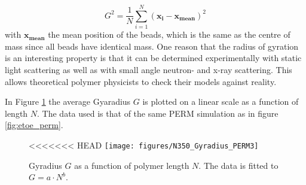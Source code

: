 \begin{equation}
    G^2 = \frac{1}{N} \sum_{i=1}^N \left( \mathbf{x_i} - \mathbf{x_{mean}} \right)^2
\end{equation}
with $\mathbf{x_{mean}}$ the mean position of the beads, which is the same as the centre of mass since all beads have identical mass. One reason that the radius of gyration is an interesting property is that it can be determined experimentally with static light scattering as well as with small angle neutron- and x-ray scattering. This allows theoretical polymer physicists to check their models against reality.\cite{grosberg1994}

In Figure \ref{fig:gyradius} the average Gyaradius $G$ is plotted on a linear scale as a function of length $N$. The data used is that of the same PERM simulation as in figure \ref{fig:etoe_perm}.

\begin{figure}[ht!]
\centering
<<<<<<< HEAD
\texttt{[image: figures/N350\_Gyradius\_PERM3]}
\caption{Gyradius $G$ as a function of polymer length $N$. The data is fitted to $G=a\cdot N^b$.}
\label{fig:gyradius}
\end{figure}